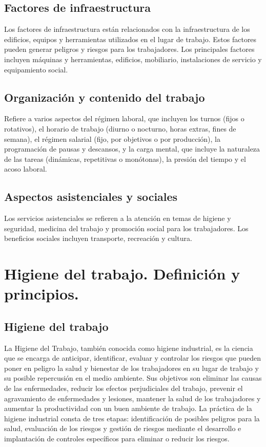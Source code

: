\subsection{Factores de infraestructura}

Los factores de infraestructura están relacionados con la \gls{infraestructura}
de los edificios, equipos y herramientas utilizados en el lugar de trabajo.
Estos factores pueden generar peligros y riesgos para los trabajadores. Los
principales factores incluyen máquinas y herramientas, edificios, mobiliario,
instalaciones de servicio y equipamiento social.

\subsection{Organización y contenido del trabajo}

Refiere a varios aspectos del régimen laboral, que incluyen los turnos (fijos o
rotativos), el horario de trabajo (diurno o nocturno, horas extras, fines de
semana), el régimen salarial (fijo, por objetivos o por producción), la
programación de pausas y descansos, y la carga mental, que incluye la
naturaleza de las tareas (dinámicas, repetitivas o monótonas), la presión del
tiempo y el acoso laboral.

\subsection{Aspectos asistenciales y sociales}

Los servicios asistenciales se refieren a la atención en temas de higiene y
seguridad, medicina del trabajo y promoción social para los trabajadores. Los
beneficios sociales incluyen transporte, recreación y cultura.

\section{Higiene del trabajo. Definición y principios.}

\subsection{Higiene del trabajo}

La Higiene del Trabajo, también conocida como higiene industrial, es la
ciencia que se encarga de anticipar, identificar, evaluar y controlar los
riesgos que pueden poner en peligro la salud y bienestar de los trabajadores
en su lugar de trabajo y su posible repercusión en el medio ambiente. Sus
objetivos son eliminar las causas de las enfermedades, reducir los efectos
perjudiciales del trabajo, prevenir el agravamiento de enfermedades y lesiones,
mantener la salud de los trabajadores y aumentar la productividad con un buen
ambiente de trabajo. La práctica de la higiene industrial consta de tres etapas:
identificación de posibles peligros para la salud, evaluación de los riesgos y
gestión de riesgos mediante el desarrollo e implantación de controles
específicos para eliminar o reducir los riesgos.

